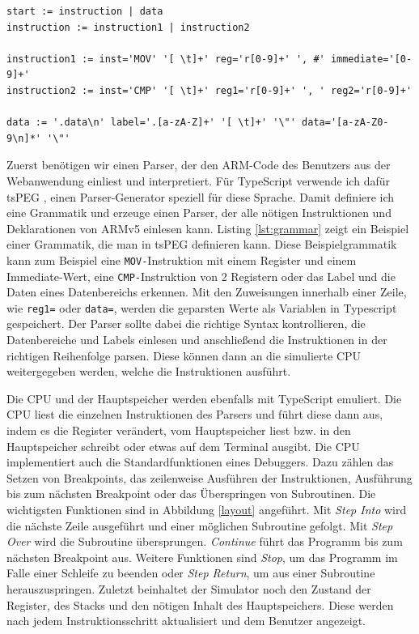\documentclass[a4paper, 11pt, onecolumn]{article}
\begin{document}
\begin{lstlisting}[caption={Beispielgrammatik mit tsPEG für 2 verschiedene Instruktionen und Daten eines Speicherbereichs mit Label.},label={lst:grammar}]
start := instruction | data
instruction := instruction1 | instruction2

instruction1 := inst='MOV' '[ \t]+' reg='r[0-9]+' ', #' immediate='[0-9]+'
instruction2 := inst='CMP' '[ \t]+' reg1='r[0-9]+' ', ' reg2='r[0-9]+'

data := '.data\n' label='.[a-zA-Z]+' '[ \t]+' '\"' data='[a-zA-Z0-9\n]*' '\"'
\end{lstlisting}

Zuerst benötigen wir einen Parser, der den ARM-Code des Benutzers aus der Webanwendung einliest und interpretiert. Für TypeScript verwende ich dafür tsPEG \cite{tspeg}, einen Parser-Generator speziell für diese Sprache. Damit definiere ich eine Grammatik und erzeuge einen Parser, der alle nötigen Instruktionen und Deklarationen von ARMv5 einlesen kann. Listing \ref{lst:grammar} zeigt ein Beispiel einer Grammatik, die man in tsPEG definieren kann. Diese Beispielgrammatik kann zum Beispiel eine \texttt{MOV-}Instruktion mit einem Register und einem Immediate-Wert, eine \texttt{CMP-}Instruktion von 2 Registern oder das Label und die Daten eines Datenbereichs erkennen. Mit den Zuweisungen innerhalb einer Zeile, wie \texttt{reg1=} oder \texttt{data=}, werden die geparsten Werte als Variablen in Typescript gespeichert. Der Parser sollte dabei die richtige Syntax kontrollieren, die Datenbereiche und Labels einlesen und anschließend die Instruktionen in der richtigen Reihenfolge parsen. Diese können dann an die simulierte CPU weitergegeben werden, welche die Instruktionen ausführt.

Die CPU und der Hauptspeicher werden ebenfalls mit TypeScript emuliert. Die CPU liest die einzelnen Instruktionen des Parsers und führt diese dann aus, indem es die Register verändert, vom Hauptspeicher liest bzw. in den Hauptspeicher schreibt oder etwas auf dem Terminal ausgibt. Die CPU implementiert auch die Standardfunktionen eines Debuggers. Dazu zählen das Setzen von Breakpoints, das zeilenweise Ausführen der Instruktionen, Ausführung bis zum nächsten Breakpoint oder das Überspringen von Subroutinen. Die wichtigsten Funktionen sind in Abbildung \ref{layout} angeführt. Mit \textit{Step Into} wird die nächste Zeile ausgeführt und einer möglichen Subroutine gefolgt. Mit \textit{Step Over} wird die Subroutine übersprungen. \textit{Continue} führt das Programm bis zum nächsten Breakpoint aus. Weitere Funktionen sind \textit{Stop}, um das Programm im Falle einer Schleife zu beenden oder \textit{Step Return}, um aus einer Subroutine herauszuspringen. Zuletzt beinhaltet der Simulator noch den Zustand der Register, des Stacks und den nötigen Inhalt des Hauptspeichers. Diese werden nach jedem Instruktionsschritt aktualisiert und dem Benutzer angezeigt.
\end{document}
